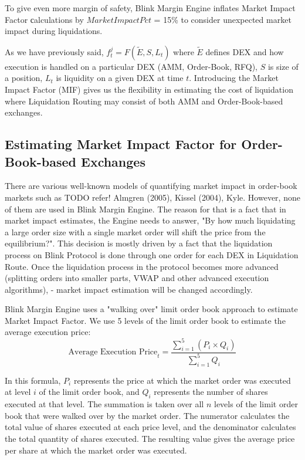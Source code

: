 \documentclass[letterpaper, 12pt]{article}
\begin{document}
To give even more margin of safety, Blink Margin Engine inflates Market Impact Factor сalculations by $MarketImpactPct$ = 15\% to consider unexpected market impact during liquidations. 

As we have previously said, $f_{t}^{j} = F(\widetilde{E}, S, L_{t})$ where $\widetilde{E}$ defines DEX and how execution is handled on a particular DEX (AMM, Order-Book, RFQ), $S$ is size of a position, $L_{t}$ is liquidity on a given DEX at time $t$. Introducing the Market Impact Factor (MIF) gives us the flexibility in estimating the cost of liquidation where Liquidation Routing may consist of both AMM and Order-Book-based exchanges.


\subsection{Estimating Market Impact Factor for Order-Book-based Exchanges}

There are various well-known models of quantifying market impact in order-book markets such as TODO refer! Almgren (2005), Kissel (2004), Kyle. However, none of them are used in Blink Margin Engine. The reason for that is a fact that in market impact estimates, the Engine needs to answer, "By how much liquidating a large order size with a single market order will shift the price from the equilibrium?". This decision is mostly driven by a fact that the liquidation process on Blink Protocol is done through one order for each DEX in Liquidation Route. Once the liquidation process in the protocol becomes more advanced (splitting orders into smaller parts, VWAP and other advanced execution algorithms), - market impact estimation will be changed accordingly.  

Blink Margin Engine uses a "walking over" limit order book approach to estimate Market Impact Factor. We use 5 levels of the limit order book to estimate the average execution price: $$ \text{Average Execution Price}_{t} = \frac{\sum\limits_{i=1}^{5} (P_i \times Q_i)}{\sum\limits_{i=1}^{5} Q_i} $$

In this formula, $P_i$ represents the price at which the market order was executed at level $i$ of the limit order book, and $Q_i$ represents the number of shares executed at that level. The summation is taken over all $n$ levels of the limit order book that were walked over by the market order. The numerator calculates the total value of shares executed at each price level, and the denominator calculates the total quantity of shares executed. The resulting value gives the average price per share at which the market order was executed.
\end{document}
